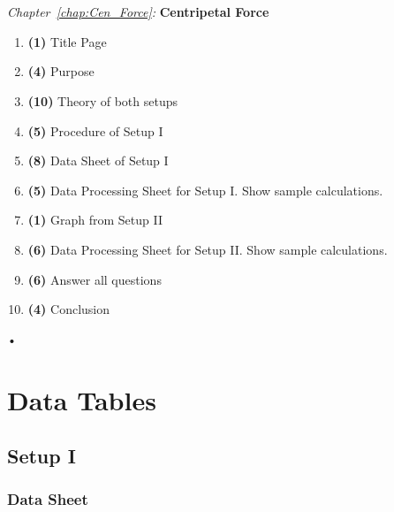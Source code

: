 \documentclass[main.tex]{subfiles}
\begin{document}
\begin{samepage}
\hrulefill \\ \\
\emph{Chapter~\ref{chap:Cen_Force}:} \textbf{Centripetal Force}
\begin{enumerate}
\item
\textbf{(1)} Title Page
\item
\textbf{(4)} Purpose
\item
\textbf{(10)} Theory of both setups
\item
\textbf{(5)} Procedure of Setup I
\item
\textbf{(8)} Data Sheet of Setup I
\item
\textbf{(5)} Data Processing Sheet for Setup I. Show sample calculations.
\item
\textbf{(1)} Graph from Setup II
\item
\textbf{(6)} Data Processing Sheet for Setup II. Show sample calculations.
\item
\textbf{(6)} Answer all questions
\item
\textbf{(4)} Conclusion
\end{enumerate}•
\end{samepage}

\newpage
\section{Data Tables}
\subsection*{Setup I}
\subsubsection*{Data Sheet}
\end{document}
